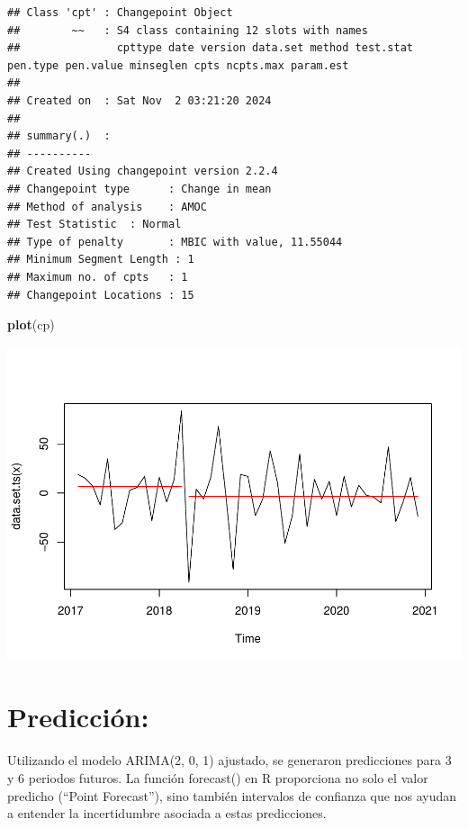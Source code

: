\documentclass[
]{book}
\newenvironment{Shaded}{\begin{snugshade}}{\end{snugshade}}
\newcommand{\FunctionTok}[1]{\textcolor[rgb]{0.13,0.29,0.53}{\textbf{#1}}}
\newcommand{\NormalTok}[1]{#1}
\begin{document}
\begin{verbatim}
## Class 'cpt' : Changepoint Object
##        ~~   : S4 class containing 12 slots with names
##               cpttype date version data.set method test.stat pen.type pen.value minseglen cpts ncpts.max param.est 
## 
## Created on  : Sat Nov  2 03:21:20 2024 
## 
## summary(.)  :
## ----------
## Created Using changepoint version 2.2.4 
## Changepoint type      : Change in mean 
## Method of analysis    : AMOC 
## Test Statistic  : Normal 
## Type of penalty       : MBIC with value, 11.55044 
## Minimum Segment Length : 1 
## Maximum no. of cpts   : 1 
## Changepoint Locations : 15
\end{verbatim}

\begin{Shaded}
\begin{Highlighting}[]
\FunctionTok{plot}\NormalTok{(cp)}
\end{Highlighting}
\end{Shaded}

\includegraphics{_main_files/figure-latex/unnamed-chunk-19-1.pdf}

\section{Predicción:}\label{predicciuxf3n}

Utilizando el modelo ARIMA(2, 0, 1) ajustado, se generaron predicciones para 3 y 6 periodos futuros. La función forecast() en R proporciona no solo el valor predicho (``Point Forecast''), sino también intervalos de confianza que nos ayudan a entender la incertidumbre asociada a estas predicciones.
\end{document}
